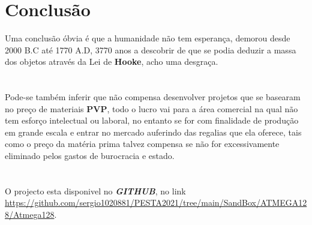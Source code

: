 \chapter{Conclusão}
Uma conclusão óbvia é que a humanidade não tem esperança, demorou desde 2000 B.C até 1770 A.D, 3770 anos a descobrir de que se podia deduzir a massa dos objetos através da Lei de \textbf{Hooke}, acho uma desgraça. \\
\\
\\
Pode-se também inferir que não compensa desenvolver projetos que se basearam no preço de materiais \textbf{PVP}, todo o lucro vai para a área comercial na qual não tem esforço intelectual ou laboral, no entanto se for com finalidade de produção em grande escala e entrar no mercado auferindo das regalias que ela oferece, tais como o preço da matéria prima talvez compensa se não for excessivamente eliminado pelos gastos de burocracia e estado. \\
\\
\\
O projecto esta disponivel no \textit{\textbf{GITHUB}}, no link \url{https://github.com/sergio1020881/PESTA2021/tree/main/SandBox/ATMEGA128/Atmega128}.




